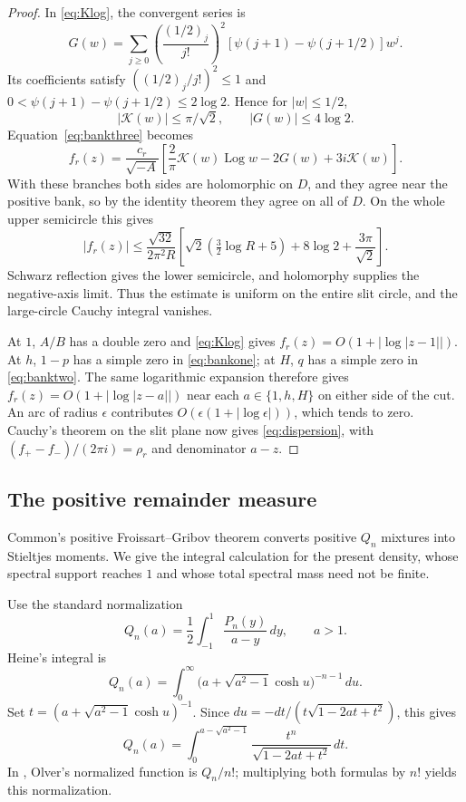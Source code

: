 \begin{proof}
In \eqref{eq:Klog}, the convergent series \cite[19.12.1--19.12.3]{DLMF} is
\[
 G(w)=\sum_{j\ge0}\left(\frac{(1/2)_j}{j!}\right)^2
       [\psi(j+1)-\psi(j+1/2)]w^j.
\]
Its coefficients satisfy $((1/2)_j/j!)^2\le1$ and
$0<\psi(j+1)-\psi(j+1/2)\le2\log2$. Hence for $|w|\le1/2$,
\[
 |\mathcal K(w)|\le\pi/\sqrt2,\qquad |G(w)|\le4\log2.
\]
Equation~\eqref{eq:bankthree} becomes
\begin{equation}\label{eq:fullcircle}
 f_r(z)=\frac{c_r}{\sqrt{-A}}
 \left[\frac2\pi\mathcal K(w)\operatorname{Log}w
       -2G(w)+3i\mathcal K(w)\right].
\end{equation}
With these branches both sides are holomorphic on $D$, and they agree
near the positive bank, so by the identity theorem they agree on all
of $D$. On the whole upper semicircle this gives
\[
 |f_r(z)|\le\frac{\sqrt{32}}{2\pi^2R}
 \left[\sqrt2\left(\tfrac32\log R+5\right)
             +8\log2+\frac{3\pi}{\sqrt2}\right].
\]
Schwarz reflection gives the lower semicircle, and holomorphy supplies the
negative-axis limit. Thus the estimate is uniform on the entire slit
circle, and the large-circle Cauchy integral vanishes.

At $1$, $A/B$ has a double zero and \eqref{eq:Klog} gives
$f_r(z)=O(1+|\log|z-1||)$. At $h$, $1-p$ has a simple zero in
\eqref{eq:bankone}; at $H$, $q$ has a simple zero in
\eqref{eq:banktwo}. The same logarithmic expansion therefore gives
$f_r(z)=O(1+|\log|z-a||)$ near each $a\in\{1,h,H\}$ on either
side of the cut. An arc of radius $\epsilon$ contributes
$O(\epsilon(1+|\log\epsilon|))$, which tends to zero.
Cauchy's theorem
on the slit plane now gives \eqref{eq:dispersion}, with
$(f_+-f_-)/(2\pi i)=\rho_r$ and denominator $a-z$.
\end{proof}

\subsection{The positive remainder measure}
Common's positive Froissart--Gribov theorem
\cite[CERN preprint, Section 4, Theorem 5]{Common} converts positive
$Q_n$ mixtures into Stieltjes moments. We give the integral calculation
for the present density, whose spectral support reaches $1$ and whose
total spectral mass need not be finite.

Use the standard normalization
\[
 Q_n(a)=\frac12\int_{-1}^1\frac{P_n(y)}{a-y}\,dy,\qquad a>1.
\]
Heine's integral is
\[
 Q_n(a)=\int_0^\infty
       \bigl(a+\sqrt{a^2-1}\cosh u\bigr)^{-n-1}\,du.
\]
Set $t=(a+\sqrt{a^2-1}\cosh u)^{-1}$. Since
$du=-dt/(t\sqrt{1-2at+t^2})$, this gives
\begin{equation}\label{eq:Qpositive}
 Q_n(a)=\int_0^{a-\sqrt{a^2-1}}
       \frac{t^n}{\sqrt{1-2at+t^2}}\,dt .
\end{equation}
In \cite[14.12.13--14.12.14]{DLMF}, Olver's normalized function is
$Q_n/n!$; multiplying both formulas by $n!$ yields this
normalization.

